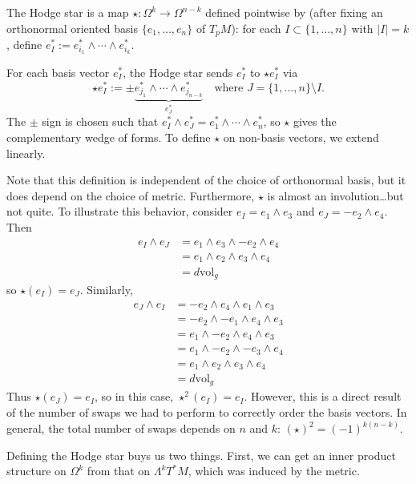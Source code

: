 \documentclass[main]{subfiles}
\begin{document}
\begin{definition}
The Hodge star is a map $\star : \Omega^k \to \Omega^{n-k}$ defined pointwise by (after fixing an orthonormal oriented basis $\{e_1,\ldots,e_n\}$ of $T_pM$): for each $I \subset \{1,\ldots,n\}$ with $|I|=k$, define $e_I^\ast := e_{i_1}^\ast \wedge \cdots \wedge e_{i_k}^\ast$.

For each basis vector $e_I^\ast$, the Hodge star sends $e_I^\ast$ to $\star e_I^\ast$ via
\[
\star e_I^\ast := \pm \underbrace{e_{j_1}^\ast \wedge \cdots \wedge e_{j_{n-k}}^\ast}_{e_J^\ast} \quad \text{where } J = \{1,\ldots,n\}\setminus I.
\]
The $\pm$ sign is chosen such that $e_I^\ast \wedge e_J^\ast = e_1^\ast \wedge \cdots \wedge e_n^\ast$, so $\star$ gives the complementary wedge of forms. To define $\star$ on non-basis vectors, we extend linearly.
\end{definition}

Note that this definition is independent of the choice of orthonormal basis, but it does depend on the choice of metric. Furthermore, $\star$ is almost an involution\ldots but not quite. To illustrate this behavior, consider $e_I = e_1\wedge e_3$ and $e_J = -e_2 \wedge e_4$.
Then 
\begin{align*}
e_I \wedge e_J &= e_1\wedge e_3 \wedge -e_2\wedge e_4 \\
&= e_1\wedge e_2\wedge e_3\wedge e_4 \\
&= d\mathrm{vol}_g
\end{align*}
so $\star(e_I)=e_J$. 
Similarly, 
\begin{align*}
e_J\wedge e_I &=-e_2\wedge e_4\wedge e_1\wedge e_3\\
&=-e_2\wedge -e_1\wedge e_4\wedge e_3\\
&=e_1\wedge -e_2\wedge e_4\wedge e_3 \\
&=e_1\wedge -e_2\wedge -e_3\wedge e_4\\
&=e_1\wedge e_2\wedge e_3\wedge e_4 \\
&= d\mathrm{vol}_g
\end{align*}
Thus $\star(e_J)=e_I$, so in this case, $\star^2(e_I)=e_I$. However, this is a direct result of the number of swaps we had to perform to correctly order the basis vectors. In general, the total number of swaps depends on $n$ and $k$: $(\star)^2 = (-1)^{k(n-k)}$. 

Defining the Hodge star buys us two things. First, we can get an inner product structure on $\Omega^k$ from that on $\Lambda^k T^\ast M$, which was induced by the metric.
\end{document}

